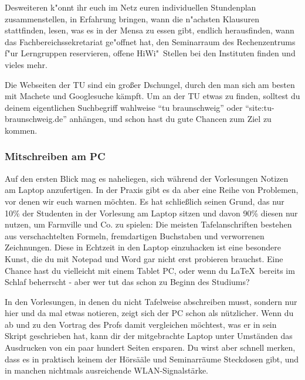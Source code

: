 Desweiteren k"onnt ihr euch im Netz euren individuellen Stundenplan
zusammenstellen, in Erfahrung bringen, wann die n"achsten Klausuren
stattfinden, lesen, was es in der Mensa zu essen gibt, endlich herausfinden,
wann das Fachbereichssekretariat ge"offnet hat, den Seminarraum des
Rechenzentrums f"ur Lerngruppen reservieren, offene HiWi"~Stellen bei den
Instituten finden und vieles mehr.

Die Webseiten der TU sind ein großer Dschungel, durch den man sich am besten 
mit Machete und Googlesuche kämpft. Um an der TU etwas zu finden, solltest 
du deinem eigentlichen Suchbegriff wahlweise "`tu braunschweig"' oder 
"`site:tu-braunschweig.de"' anhängen, und schon hast du gute Chancen zum Ziel 
zu kommen.

\begin{center}%
\subsubsection{Mitschreiben am PC}
Auf den ersten Blick mag es naheliegen, sich während der Vorlesungen Notizen 
am Laptop anzufertigen. In der Praxis gibt es da aber eine Reihe von Problemen, 
vor denen wir euch warnen möchten. Es hat schließlich seinen Grund, das nur 
10\% der Studenten in der Vorlesung am Laptop sitzen und davon 90\% diesen nur 
nutzen, um Farmville und Co. zu spielen: Die meisten Tafelanschriften bestehen 
aus verschachtelten Formeln, fremdartigen Buchstaben und verworrenen 
Zeichnungen. Diese in Echtzeit in den Laptop einzuhacken ist eine besondere
 Kunst, die du mit Notepad und Word gar nicht erst probieren brauchst. Eine 
 Chance hast du vielleicht mit einem Tablet PC, oder wenn du \LaTeX\ bereits 
 im Schlaf beherrscht - aber wer tut das schon zu Beginn des Studiums?

In den Vorlesungen, in denen du nicht Tafelweise abschreiben musst, sondern 
nur hier und da mal etwas notieren, zeigt sich der PC schon als nützlicher. 
Wenn du ab und zu den Vortrag des Profs damit vergleichen möchtest, was er 
in sein Skript geschrieben hat, kann dir der mitgebrachte Laptop unter 
Umständen das Ausdrucken von ein paar hundert Seiten ersparen. Du wirst aber 
schnell merken, dass es in praktisch keinem der Hörsääle und Seminarräume 
Steckdosen gibt, und in manchen nichtmals ausreichende WLAN-Signalstärke.


\end{center}
